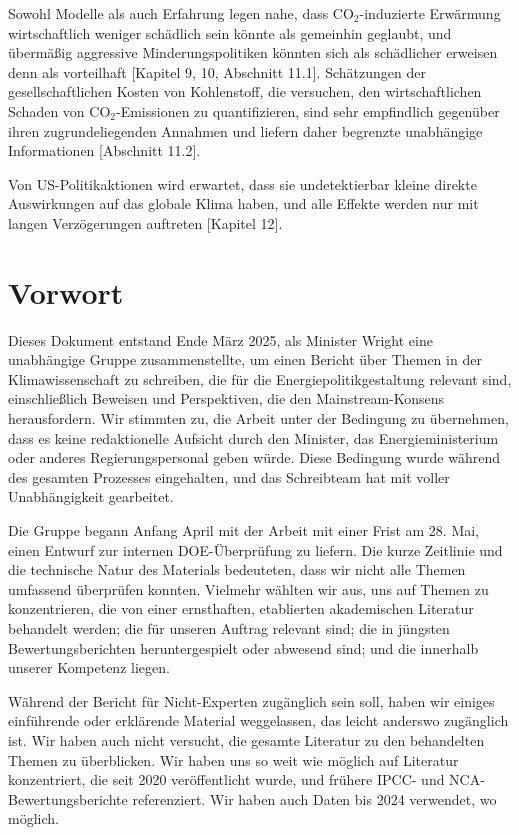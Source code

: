 \documentclass[12pt,paper=a4,DIV=12,parskip=never,chapterprefix=false,headings=standardclasses]{scrreprt}
\begin{document}
Sowohl Modelle als auch Erfahrung legen nahe, dass CO$_2$-induzierte Erwärmung wirtschaftlich weniger schädlich sein könnte als gemeinhin geglaubt, und übermäßig aggressive Minderungspolitiken könnten sich als schädlicher erweisen denn als vorteilhaft [Kapitel 9, 10, Abschnitt 11.1]. Schätzungen der gesellschaftlichen Kosten von Kohlenstoff, die versuchen, den wirtschaftlichen Schaden von CO$_2$-Emissionen zu quantifizieren, sind sehr empfindlich gegenüber ihren zugrundeliegenden Annahmen und liefern daher begrenzte unabhängige Informationen [Abschnitt 11.2].

Von US-Politikaktionen wird erwartet, dass sie undetektierbar kleine direkte Auswirkungen auf das globale Klima haben, und alle Effekte werden nur mit langen Verzögerungen auftreten [Kapitel 12].

\cleardoublepage
\chapter*{Vorwort}
Dieses Dokument entstand Ende März 2025, als Minister Wright eine unabhängige Gruppe zusammenstellte, um einen Bericht über Themen in der Klimawissenschaft zu schreiben, die für die Energiepolitikgestaltung relevant sind, einschließlich Beweisen und Perspektiven, die den Mainstream-Konsens herausfordern. Wir stimmten zu, die Arbeit unter der Bedingung zu übernehmen, dass es keine redaktionelle Aufsicht durch den Minister, das Energieministerium oder anderes Regierungspersonal geben würde. Diese Bedingung wurde während des gesamten Prozesses eingehalten, und das Schreibteam hat mit voller Unabhängigkeit gearbeitet.

Die Gruppe begann Anfang April mit der Arbeit mit einer Frist am 28. Mai, einen Entwurf zur internen DOE-Überprüfung zu liefern. Die kurze Zeitlinie und die technische Natur des Materials bedeuteten, dass wir nicht alle Themen umfassend überprüfen konnten. Vielmehr wählten wir aus, uns auf Themen zu konzentrieren, die von einer ernsthaften, etablierten akademischen Literatur behandelt werden; die für unseren Auftrag relevant sind; die in jüngsten Bewertungsberichten heruntergespielt oder abwesend sind; und die innerhalb unserer Kompetenz liegen.

Während der Bericht für Nicht-Experten zugänglich sein soll, haben wir einiges einführende oder erklärende Material weggelassen, das leicht anderswo zugänglich ist. Wir haben auch nicht versucht, die gesamte Literatur zu den behandelten Themen zu überblicken. Wir haben uns so weit wie möglich auf Literatur konzentriert, die seit 2020 veröffentlicht wurde, und frühere IPCC- und NCA-Bewertungsberichte referenziert. Wir haben auch Daten bis 2024 verwendet, wo möglich.
\end{document}
